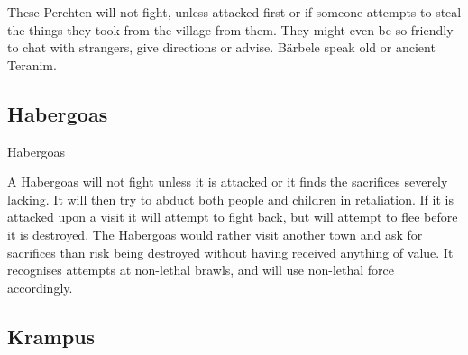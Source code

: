 These Perchten will not fight, unless attacked first or if someone attempts to
steal the things they took from the village from them. They might even be so
friendly to chat with strangers, give directions or advise. Bärbele speak old
or ancient Teranim.

\subsection{Habergoas}
\label{sec:monsters:Habergoas}

\begin{35e}{\Large{Habergoas}}
\end{35e}

A Habergoas will not fight unless it is attacked or it finds the sacrifices
severely lacking. It will then try to abduct both people and children in
retaliation. If it is attacked upon a visit it will attempt to fight back,
but will attempt to flee before it is destroyed. The Habergoas would rather
visit another town and ask for sacrifices than risk being destroyed without
having received anything of value. It recognises attempts at non-lethal
brawls, and will use non-lethal force accordingly.

\subsection{Krampus}
\label{sec:monsters:Krampus}

